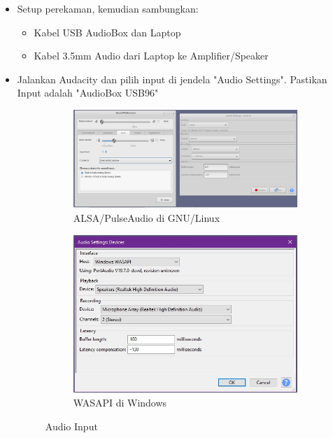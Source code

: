 \documentclass{article}
\begin{document}
	\begin{itemize}
		\item Setup perekaman, kemudian sambungkan:
		\begin{itemize}
			\item Kabel USB AudioBox dan Laptop
			\item Kabel 3.5mm Audio dari Laptop ke Amplifier/Speaker
		\end{itemize}

		\item Jalankan Audacity dan pilih input di jendela "Audio Settings".
		Pastikan Input adalah "AudioBox USB96"

		\begin{figure}[H]
			\centering
			\begin{subfigure}[]{.55\textwidth}
				\includegraphics[width=\textwidth]{images/audacity_in_linux}
				\caption{ALSA/PulseAudio di GNU/Linux}
			\end{subfigure}
			\begin{subfigure}[]{.35\textwidth}
				\includegraphics[width=\textwidth]{images/audacity_in_windows}
				\caption{WASAPI di Windows}
			\end{subfigure}
			\caption{Audio Input}
		\end{figure}


\end{itemize}
\end{document}
